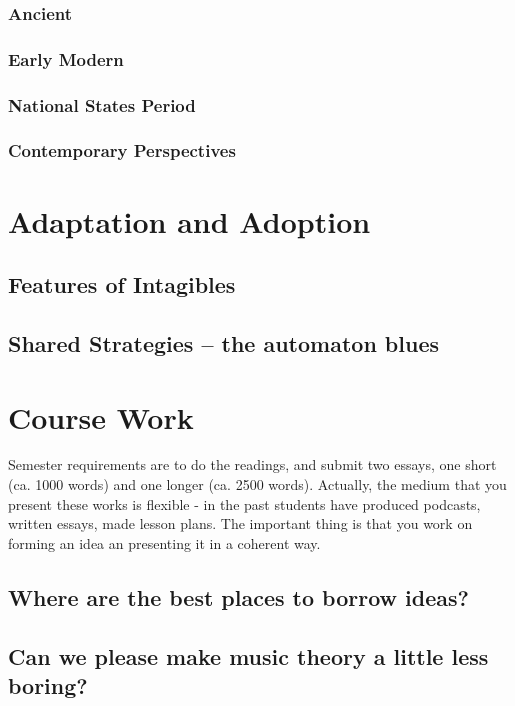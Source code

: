 \documentclass[11pt]{article}
\begin{document}
\subsubsection*{Ancient}
\label{sec:orgd974401}
\subsubsection*{Early Modern}
\label{sec:org6656c38}
\subsubsection*{National States Period}
\label{sec:org56fc92d}
\subsubsection*{Contemporary Perspectives}
\label{sec:org903cdd1}


\section*{Adaptation and Adoption}
\label{sec:org6c08d24}
\subsection*{Features of Intagibles}
\label{sec:orgde94e45}
\subsection*{Shared Strategies – the automaton blues}
\label{sec:orgb618d84}


\section*{Course Work}
\label{sec:orge7e3641}
Semester requirements are to do the readings, and submit two essays,
one short (ca. 1000 words) and one longer (ca. 2500 words). Actually,
the medium that you present these works is flexible - in the past
students have produced podcasts, written essays, made lesson
plans. The important thing is that you work on forming an idea an
presenting it in a coherent way.

\subsection*{Where are the best places to borrow ideas?}
\label{sec:org27fd1a0}
\subsection*{Can we please make music theory a little less boring?}
\label{sec:org02ff98d}
\end{document}
